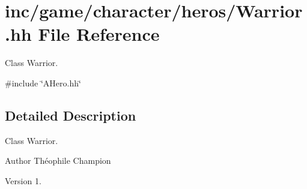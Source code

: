 \hypertarget{Warrior_8hh}{}\section{inc/game/character/heros/\+Warrior.hh File Reference}
\label{Warrior_8hh}


Class Warrior.  


{\ttfamily \#include \char`\"{}A\+Hero.\+hh\char`\"{}}\newline


\subsection{Detailed Description}
Class Warrior. 

\begin{DoxyAuthor}{Author}
Théophile Champion 
\end{DoxyAuthor}
\begin{DoxyVersion}{Version}
1. 
\end{DoxyVersion}
